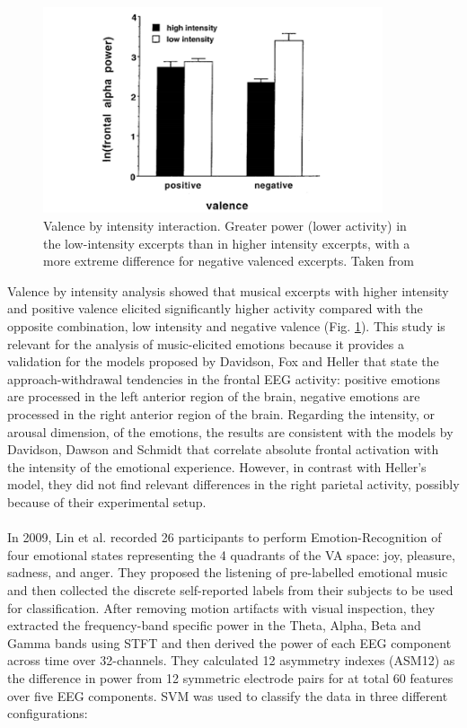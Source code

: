 \begin{figure}[ht!]
\includegraphics[width=10cm]{img/related_work/valence_intensity.png}
\centering
\caption{Valence by intensity interaction. Greater power (lower activity) in the low-intensity excerpts than in higher intensity excerpts, with a more extreme difference for negative valenced excerpts. Taken from \cite{schmidt_frontal_2001}}\label{fig_schmidt_valence_intensity}
\end{figure}
Valence by intensity analysis showed that musical excerpts with higher intensity and positive valence elicited significantly higher activity compared with the opposite combination, low intensity and negative valence (Fig. \ref{fig_schmidt_valence_intensity}). This study is relevant for the analysis of music-elicited emotions because it provides a validation for the models proposed by Davidson, Fox and Heller that state the approach-withdrawal tendencies in the frontal \ac{EEG} activity: positive emotions are processed in the left anterior region of the brain, negative emotions are processed in the right anterior region of the brain. Regarding the intensity, or arousal dimension, of the emotions, the results are consistent with the models by Davidson, Dawson and Schmidt that correlate absolute frontal activation with the intensity of the emotional experience. However, in contrast with Heller’s model, they did not find relevant differences in the right parietal activity, possibly because of their experimental setup.
\\
\\
In 2009, Lin et al. \cite{lin_eeg-based_2009} recorded 26 participants to perform Emotion-Recognition of four emotional states representing the 4 quadrants of the \ac{VA} space: joy, pleasure, sadness, and anger. They proposed the listening of pre-labelled emotional music and then collected the discrete self-reported labels from their subjects to be used for classification. After removing motion artifacts with visual inspection, they extracted the frequency-band specific power in the Theta, Alpha, Beta and Gamma bands using \ac{STFT} and then derived the power of each \ac{EEG} component across time over 32-channels. They calculated 12 asymmetry indexes (ASM12) as the difference in power from 12 symmetric electrode pairs for at total 60 features over five \ac{EEG} components. \ac{SVM} was used to classify the data in three different configurations:

